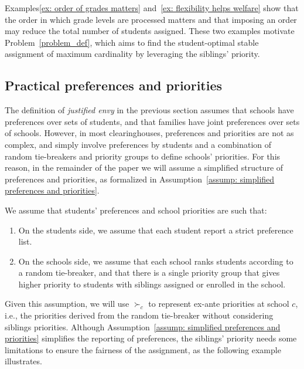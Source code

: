     Examples\ref{ex: order of grades matters} and~\ref{ex: flexibility helps welfare} show that the order in which grade levels are processed matters and that imposing an order may reduce the total number of students assigned. These two examples motivate Problem~\ref{problem_def}, which aims to find the student-optimal stable assignment of maximum cardinality by leveraging the siblings' priority.


\subsection{Practical preferences and priorities}
    The definition of \emph{justified envy} in the previous section assumes that schools have preferences over sets of students, and that families have joint preferences over sets of schools. However, in most clearinghouses, preferences and priorities are not as complex, and simply involve preferences by students and a combination of random tie-breakers and priority groups to define schools' priorities. For this reason, in the remainder of the paper we will assume a simplified structure of preferences and priorities, as formalized in Assumption~\ref{assump: simplified preferences and priorities}.

    \begin{assumption}\label{assump: simplified preferences and priorities}
      We assume that students' preferences and school priorities are such that:
      \begin{enumerate}
        \item On the students side, we assume that each student report a strict preference list.
        \item On the schools side, we assume that each school ranks students according to a random tie-breaker, and that there is a single priority group that gives higher priority to students with siblings assigned or enrolled in the school. %
      \end{enumerate}
    \end{assumption}
    Given this assumption, we will use \(\succ_c\) to represent ex-ante priorities at school \(c\), i.e., the priorities derived from the random tie-breaker without considering siblings priorities.
    Although Assumption~\ref{assump: simplified preferences and priorities} simplifies the reporting of preferences, the siblings' priority needs some limitations to ensure the fairness of the assignment, as the following example illustrates.

